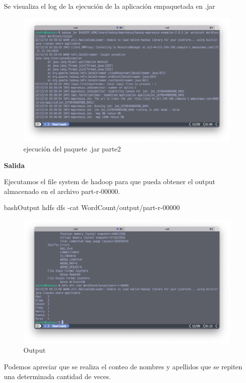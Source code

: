 Se visualiza el log de la ejecución de la aplicación empaquetada en .jar
\begin{figure}[h]
	\centering
	\includegraphics[scale=.28] {img/51-hadoop-jar-wordcloud}
	\caption{ejecución del paquete .jar parte2}
	\label{fig:51}	
\end{figure}


\textbf{Salida}

Ejecutamos el file system de hadoop para que pueda obtener el output almacenado en el archivo part-r-00000.
\begin{sourcecode}[]{bash}{Output}
hdfs dfs -cat WordCount/output/part-r-00000
\end{sourcecode}

\begin{figure}[h]
	\centering
	\includegraphics[scale=.28] {img/52-output-hdfs-dfs}
	\caption{Output}
	\label{fig:52}	
\end{figure}

Podemos apreciar que se realiza el conteo de nombres y apellidos que se repiten una determinada cantidad de veces.

